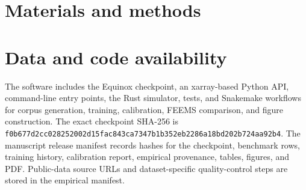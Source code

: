 \documentclass[11pt]{article}
\newcommand{\feems}{FEEMS\xspace}
\begin{document}
\section{Materials and methods}



\section*{Data and code availability}

The software includes the Equinox checkpoint, an xarray-based Python API,
command-line entry points, the Rust simulator, tests, and Snakemake workflows
for corpus generation, training, calibration, \feems comparison, and figure
construction. The exact checkpoint SHA-256 is
\texttt{f0b677d2cc028252002d15fac843ca7347b1b352eb2286a18bd202b724aa92b4}.
The manuscript release manifest records hashes for the checkpoint, benchmark
rows, training history, calibration report, empirical provenance, tables,
figures, and PDF. Public-data source URLs and dataset-specific quality-control
steps are stored in the empirical manifest.



\end{document}
